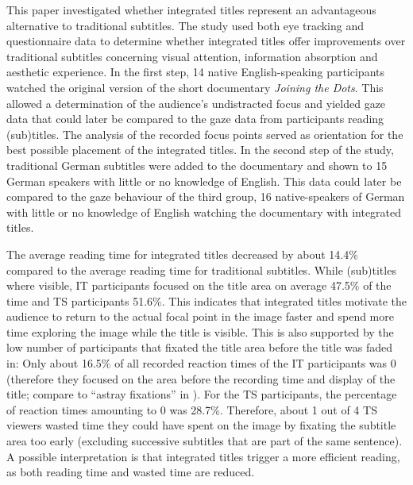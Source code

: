 \documentclass[output=paper]{langsci/langscibook}
\begin{document}
This paper investigated whether integrated titles represent an advantageous alternative to traditional subtitles. The study used both eye tracking and questionnaire data to determine whether integrated titles offer improvements over traditional subtitles concerning visual attention, information absorption and aesthetic experience. In the first step, 14 native English-speaking participants watched the original version of the short documentary \textit{Joining the Dots}. This allowed a determination of the audience's undistracted focus and yielded gaze data that could later be compared to the gaze data from participants reading (sub)titles. The analysis of the recorded focus points served as orientation for the best possible placement of the integrated titles. In the second step of the study, traditional German subtitles were added to the documentary and shown to 15 German speakers with little or no knowledge of English. This data could later be compared to the gaze behaviour of the third group, 16 native-speakers of German with little or no knowledge of English watching the documentary with integrated titles.


The average reading time for integrated titles decreased by about 14.4\% compared to the average reading time for traditional subtitles. While (sub)titles where visible, IT participants focused on the title area on average 47.5\% of the time and TS participants 51.6\%. This indicates that integrated titles motivate the audience to return to the actual focal point in the image faster and spend more time exploring the image while the title is visible. This is also supported by the low number of participants that fixated the title area before the title was faded in: Only about 16.5\% of all recorded reaction times of the IT participants was 0 (therefore they focused on the area before the recording time and display of the title; compare to ``astray fixations'' in \citealt{rajendran2013}). For the TS participants, the percentage of reaction times amounting to 0 was 28.7\%. Therefore, about 1 out of 4 TS viewers wasted time they could have spent on the image by fixating the subtitle area too early (excluding successive subtitles that are part of the same sentence). A possible interpretation is that integrated titles trigger a more efficient reading, as both reading time and wasted time are reduced.
\end{document}
